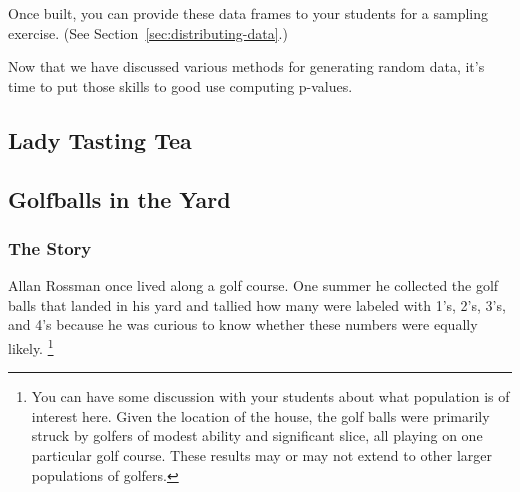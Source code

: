 Once built, you can provide these data frames to your students for a sampling exercise.
(See Section~\ref{sec:distributing-data}.)



Now that we have discussed various methods for generating random data, it's time to put those 
skills to good use computing p-values.

\subsection{Lady Tasting Tea}

\subsection{Golfballs in the Yard}

\subsubsection{The Story}
Allan Rossman once lived along a golf course.  One summer he collected the golf balls that
landed in his yard and tallied how many were labeled with 1's, 2's, 3's, and 4's 
because he was curious to know whether these numbers were equally likely.%
\footnote{You can have some discussion with your students about what population
is of interest here.  Given the location of the house, the golf balls were primarily struck
by golfers of modest ability and significant slice, all playing on one particular golf course.
These results may or may not extend to other larger populations of golfers.
}


